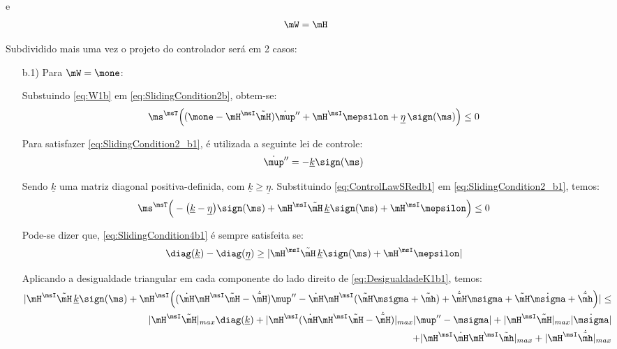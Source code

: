 \documentclass[]{politex}
\begin{document}
\begin{itemize}
e
\begin{equation} \label{eq:W2b}
\mW = \mH
\end{equation}

Subdividido mais uma vez o projeto do controlador será  em 2 casos:

\begin{itemize}
\item[b.1)] Para $\mW = \mone$:


Substuindo \eqref{eq:W1b} em \eqref{eq:SlidingCondition2b}, obtem-se:
\begin{equation} \label{eq:SlidingCondition2_b1}
\ms^\msT \Big((\mone - \mH^\msI \tilde{\mH} )\dot{\mup}'' + \mH^\msI \mepsilon + \underline{\eta} \, \sign(\ms) \Big) \leq 0
\end{equation}

Para satisfazer \eqref{eq:SlidingCondition2_b1}, é utilizada a seguinte lei de controle:
\begin{equation} \label{eq:ControlLawSRedb1}
\dot{\mup}'' =  -\underline{k} \sign(\ms)
\end{equation}

Sendo $\underline{k}$ uma matriz diagonal positiva-definida, com $\underline{k} \geq \underline{\eta} $. Substituindo \eqref{eq:ControlLawSRedb1} em \eqref{eq:SlidingCondition2_b1}, temos:
\begin{equation} \label{eq:SlidingCondition4b1}
\ms^\msT \Big(- \big(\underline{k} - \underline{\eta} \big)  \sign(\ms) + \mH^\msI \tilde{\mH} \, \underline{k} \sign(\ms) + \mH^\msI \mepsilon \Big) \leq 0
\end{equation}

Pode-se dizer que, \eqref{eq:SlidingCondition4b1} \'e sempre satisfeita se:
\begin{equation} \label{eq:DesigualdadeK1b1}
 \diag(\underline{k}) - \diag(\underline{\eta}) \geq  | \mH^\msI \tilde{\mH} \, \underline{k} \sign(\ms) + \mH^\msI \mepsilon |
\end{equation}

Aplicando a desigualdade triangular em cada componente do lado direito de \eqref{eq:DesigualdadeK1b1}, temos:
\begin{equation}
\begin{split}
| \mH^\msI \tilde{\mH} \, \underline{k} \sign(\ms) + \mH^\msI \Big( ( \dot{\mH} \mH^\msI \tilde{\mH} -\dot{\tilde{\mH}}) \mup'' -  \dot{\mH} \mH^\msI ( \tilde{\mH}\msigma + \tilde{\mh} ) +  \dot{\tilde{\mH}}\msigma + \tilde{\mH} \dot{\msigma} + \dot{\tilde{\mh}} \Big) | \leq \\ |
 \mH^\msI \tilde{\mH} |_{max} \diag(\underline{k}) + |\mH^\msI ( \dot{\mH} \mH^\msI \tilde{\mH} -\dot{\tilde{\mH}}) |_{max} | \mup'' - \msigma|  + |\mH^\msI \tilde{\mH}|_{max}| \dot{\msigma}| \\
  + |\mH^\msI \dot{\mH} \mH^\msI  \tilde{\mh}|_{max}+ |\mH^\msI \dot{\tilde{\mh}}|_{max}
\end{split}
\end{equation}


\end{itemize}
\end{itemize}
\end{document}
